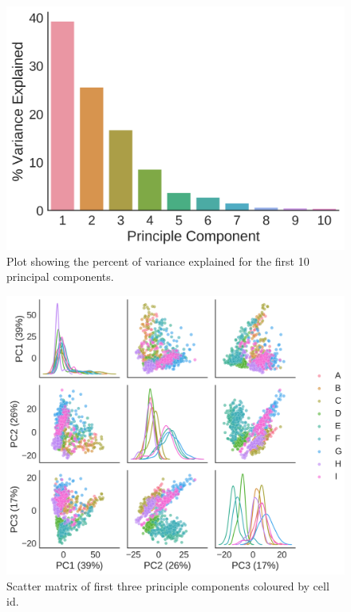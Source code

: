 \documentclass[alpha-refs]{wiley-article}
\begin{document}
\begin{figure}[b]
	\centering
	\includegraphics[height=0.35\textheight]{img/qc/pca_scree}
	\caption{Plot showing the percent of variance explained for the first 10 principal components.}
	\label{fig:qc:scree}
\end{figure}

\begin{figure}
	\centering
	\includegraphics[height=0.45\textheight]{img/qc/cell_id}
	\caption{Scatter matrix of first three principle components coloured by cell id.}
	\label{fig:qc:cell_id}
\end{figure}
\end{document}
